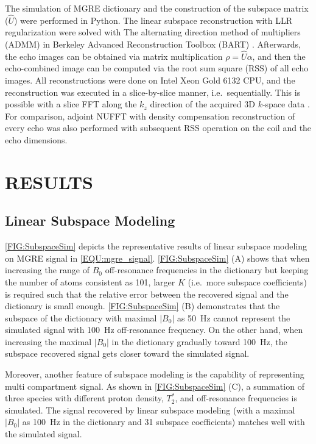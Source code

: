 \documentclass[a4paper,11pt]{article}
\begin{document}
The simulation of MGRE dictionary and 
the construction of the subspace matrix ($\hat{U}$) 
were performed in Python.
The linear subspace reconstruction with LLR regularization 
were solved with The alternating direction method of multipliers (ADMM) 
\cite{boyd_2010_admm} in Berkeley Advanced Reconstruction Toolbox (BART) 
\cite{uecker_2015_bart}. 
Afterwards, the echo images can be obtained via matrix multiplication 
$\rho = \hat{U} \alpha$, and then the echo-combined image 
can be computed via the root sum square (RSS) of all echo images.
All reconstructions were done on Intel Xeon Gold 6132 CPU, 
and the reconstruction was executed in a slice-by-slice manner, 
i.e.~sequentially. This is possible with a slice FFT along the $k_z$ direction 
of the acquired 3D $k$-space data \cite{feng_2014_grasp}. 
For comparison, adjoint NUFFT with density compensation reconstruction 
of every echo was also performed with subsequent RSS operation 
on the coil and the echo dimensions. 


\section{RESULTS}

\subsection*{Linear Subspace Modeling}

\cref{FIG:SubspaceSim} depicts the representative results of 
linear subspace modeling on MGRE signal in \cref{EQU:mgre_signal}. 
\cref{FIG:SubspaceSim} (A) shows that when increasing the range 
of $B_0$ off-resonance frequencies in the dictionary 
but keeping the number of atoms consistent as 101, 
larger $K$ (i.e.~more subspace coefficients) is required 
such that the relative error between the recovered signal and 
the dictionary is small enough.
\cref{FIG:SubspaceSim} (B) demonstrates that 
the subspace of the dictionary with maximal $|B_0|$ as \SI{50}{\Hz} 
cannot represent the simulated signal with \SI{100}{\Hz} off-resonance frequency. 
On the other hand, when increasing the maximal $|B_0|$ in the dictionary 
gradually toward \SI{100}{\Hz}, 
the subspace recovered signal gets closer toward the simulated signal.

Moreover, another feature of subspace modeling is the capability of 
representing multi compartment signal. 
As shown in \cref{FIG:SubspaceSim} (C), 
a summation of three species with different proton density, $T_2^*$, 
and off-resonance frequencies is simulated. 
The signal recovered by linear subspace modeling 
(with a maximal $|B_0|$ as 100~\si{\Hz} in the dictionary and 31 subspace coefficients) 
matches well with the simulated signal.
\end{document}
